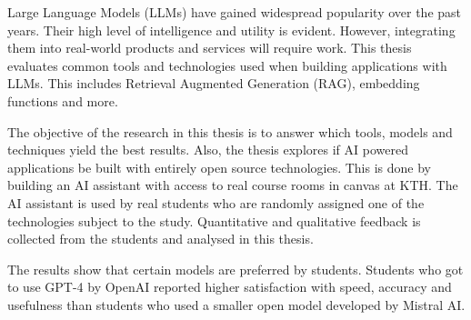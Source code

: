 \begin{scontents}[store-env=abstracts,print-env=true]






Large Language Models (LLMs) have gained widespread popularity over the past years. Their high level of intelligence and utility is evident. However, integrating them into real-world products and services will require work. This thesis evaluates common tools and technologies used when building applications with LLMs. This includes Retrieval Augmented Generation (RAG), embedding functions and more.


The objective of the research in this thesis is to answer which tools, models and techniques yield the best results. Also, the thesis explores if AI powered applications be built with entirely open source technologies. This is done by building an AI assistant with access to real course rooms in canvas at KTH. The AI assistant is used by real students who are randomly assigned one of the technologies subject to the study. Quantitative and qualitative feedback is collected from the students and analysed in this thesis.


The results show that certain models are preferred by students. Students who got to use GPT-4 by OpenAI reported higher satisfaction with speed, accuracy and usefulness than students who used a smaller open model developed by Mistral AI.



\end{scontents}
